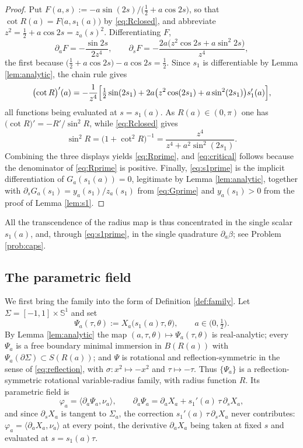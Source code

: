 \documentclass[10pt,a4paper]{amsart}
\newcommand{\Sph}{\mathbb{S}}
\begin{document}
\begin{proof}
Put $F(a,s):=-a\sin(2s)\bigl/\bigl(\tfrac12+a\cos 2s\bigr)$, so that $\cot R(a)=F\bigl(a,s_1(a)\bigr)$ by \eqref{eq:Rclosed}, and abbreviate $z^2=\tfrac12+a\cos 2s=z_a(s)^2$. Differentiating $F$,
\[
\partial_aF=-\frac{\sin 2s}{2z^4},\qquad
\partial_sF=-\frac{2a\bigl(z^2\cos 2s+a\sin^2 2s\bigr)}{z^4},
\]
the first because $\bigl(\tfrac12+a\cos2s\bigr)-a\cos 2s=\tfrac12$. Since $s_1$ is differentiable by Lemma \ref{lem:analytic}, the chain rule gives
\[
\bigl(\cot R\bigr)'(a)=-\frac{1}{z^4}\Bigl[\tfrac12\sin(2s_1)+2a\bigl(z^2\cos(2s_1)+a\sin^2(2s_1)\bigr)s_1'(a)\Bigr],
\]
all functions being evaluated at $s=s_1(a)$. As $R(a)\in(0,\pi)$ one has $\bigl(\cot R\bigr)'=-R'/\sin^2R$, while \eqref{eq:Rclosed} gives
\[
\sin^2R=\bigl(1+\cot^2R\bigr)^{-1}=\frac{z^4}{z^4+a^2\sin^2(2s_1)} .
\]
Combining the three displays yields \eqref{eq:Rprime}, and \eqref{eq:critical} follows because the denominator of \eqref{eq:Rprime} is positive. Finally, \eqref{eq:s1prime} is the implicit differentiation of $G_a(s_1(a))=0$, legitimate by Lemma \ref{lem:analytic}, together with $\partial_sG_a(s_1)=y_a(s_1)/z_a(s_1)$ from \eqref{eq:Gprime} and $y_a(s_1)>0$ from the proof of Lemma \ref{lem:s1}.
\end{proof}

All the transcendence of the radius map is thus concentrated in the single scalar $s_1(a)$, and, through \eqref{eq:s1prime}, in the single quadrature $\partial_a\beta$; see Problem \ref{prob:caps}.

\subsection*{The parametric field}

We first bring the family into the form of Definition \ref{def:family}. Let $\Sigma=[-1,1]\times\Sph^1$ and set
\begin{equation}\label{eq:Psi}
\Psi_a(\tau,\theta):=X_a\bigl(s_1(a)\tau,\theta\bigr),\qquad a\in\bigl(0,\tfrac12\bigr).
\end{equation}
By Lemma \ref{lem:analytic} the map $(a,\tau,\theta)\mapsto\Psi_a(\tau,\theta)$ is real-analytic; every $\Psi_a$ is a free boundary minimal immersion in $B(R(a))$ with $\Psi_a(\partial\Sigma)\subset S(R(a))$; and $\Psi$ is rotational and reflection-symmetric in the sense of \eqref{eq:reflection}, with $\sigma:x^2\mapsto-x^2$ and $\tau\mapsto-\tau$. Thus $\{\Psi_a\}$ is a reflection-symmetric rotational variable-radius family, with radius function $R$. Its parametric field is
\[
\varphi_a=\bigl\langle\partial_a\Psi_a,\nu_a\bigr\rangle,\qquad \partial_a\Psi_a=\partial_aX_a+s_1'(a)\,\tau\,\partial_sX_a ,
\]
and since $\partial_sX_a$ is tangent to $\Sigma_a$, the correction $s_1'(a)\,\tau\,\partial_sX_a$ never contributes: $\varphi_a=\langle\partial_aX_a,\nu_a\rangle$ at every point, the derivative $\partial_aX_a$ being taken at fixed $s$ and evaluated at $s=s_1(a)\tau$.
\end{document}
